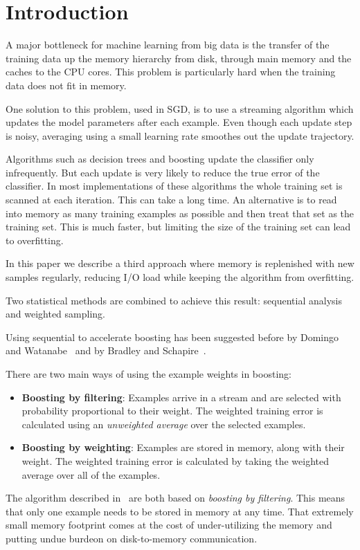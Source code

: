 \section{Introduction}\label{sec:intro}

A major bottleneck for machine learning from big data is the transfer
of the training data up the memory hierarchy from disk, through main memory
and the caches to the CPU cores. This problem is particularly hard
when the training data does not fit in memory.

One solution to this problem, used in SGD, is to use a streaming
algorithm which updates the model parameters after each
example. Even though each update step is noisy, averaging using a
small learning rate smoothes out the update trajectory.

Algorithms such as decision trees and boosting update the classifier
only infrequently. But each update is very likely to reduce the true
error of the classifier. In most implementations of these algorithms
the whole training set is scanned at each iteration. This can take a
long time. An alternative is to read into memory as many training
examples as possible and then treat that set as the training set. This
is much faster, but limiting the size of the training set can lead to
overfitting.

In this paper we describe a third approach where memory is replenished
with new samples regularly, reducing I/O load while keeping the
algorithm from overfitting.

Two statistical methods are combined to achieve this result:
sequential analysis and weighted sampling.

Using sequential to accelerate boosting has been suggested before 
by Domingo and Watanabe~\cite{domingo_scaling_2000} and
by Bradley and Schapire~\cite{bradley_filterboost:_2007}.

There are two main ways of using the example weights in boosting:
\begin{itemize}
\item {\bf Boosting by filtering}: Examples arrive in a stream and are
  selected with probability proportional to their weight. The weighted
  training error is calculated using an {\em unweighted average} over
  the selected examples.
\item {\bf Boosting by weighting}: Examples are stored in memory,
  along with their weight. The weighted training error is calculated
  by taking the weighted average over all of the examples.
\end{itemize}
The algorithm described
in~\cite{domingo_scaling_2000,bradley_filterboost:_2007} are both
based on {\em boosting by filtering}. This means that only one example
needs to be stored in memory at any time. That extremely small memory
footprint comes at the cost of under-utilizing the memory and putting
undue burdeon on disk-to-memory communication.

